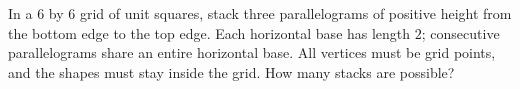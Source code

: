 In a $6$ by $6$ grid of unit squares, stack three parallelograms of positive height from the bottom edge to the top edge. Each horizontal base has length $2$; consecutive parallelograms share an entire horizontal base. All vertices must be grid points, and the shapes must stay inside the grid. How many stacks are possible?
